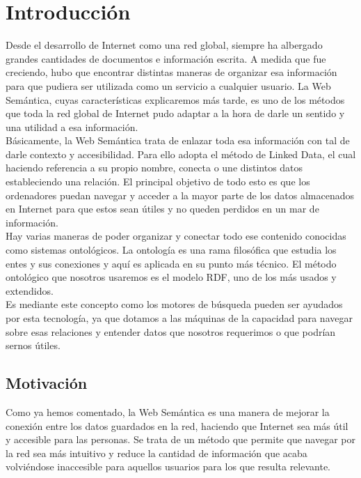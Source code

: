 \chapter{Introducción}
\label{cap:introduccion}

Desde el desarrollo de Internet como una red global, siempre ha albergado grandes cantidades de documentos e información escrita. A medida que fue creciendo, hubo que encontrar distintas maneras de organizar esa información para que pudiera ser utilizada como un servicio a cualquier usuario. La Web Semántica, cuyas características explicaremos más tarde, es uno de los métodos que toda la red global de Internet pudo adaptar a la hora de darle un sentido y una utilidad a esa información.\\

Básicamente, la Web Semántica trata de enlazar toda esa información con tal de darle contexto y accesibilidad. Para ello adopta el método de Linked Data, el cual haciendo referencia a su propio nombre, conecta o une distintos datos estableciendo una relación. El principal objetivo de todo esto es que los ordenadores puedan navegar y acceder a la mayor parte de los datos almacenados en Internet para que estos sean útiles y no queden perdidos en un mar de información.\\

Hay varias maneras de poder organizar y conectar todo ese contenido conocidas como sistemas ontológicos. La ontología es una rama filosófica que estudia los entes y sus conexiones y aquí es aplicada en su punto más técnico. El método ontológico que nosotros usaremos es el modelo RDF, uno de los más usados y extendidos.\\

Es mediante este concepto como los motores de búsqueda pueden ser ayudados por esta tecnología, ya que dotamos a las máquinas de la capacidad para navegar sobre esas relaciones y entender datos que nosotros requerimos o que podrían sernos útiles.\\

\section{Motivación}

Como ya hemos comentado, la Web Semántica es una manera de mejorar la conexión entre los datos guardados en la red, haciendo que Internet sea más útil y accesible para las personas. Se trata de un método que permite que navegar por la red sea más intuitivo y reduce la cantidad de información que acaba volviéndose inaccesible para aquellos usuarios para los que resulta relevante.\\

